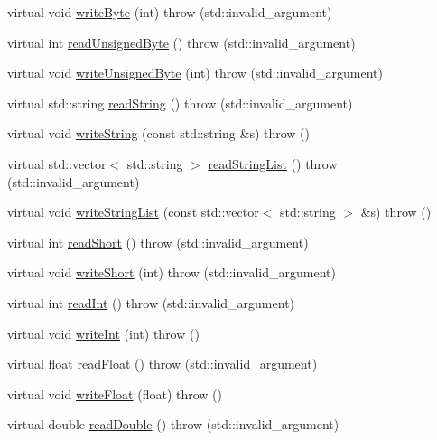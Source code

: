 \begin{DoxyCompactItemize}
virtual void \hyperlink{classtcpip_1_1_storage_a5da17974ce811aefed71169685739073}{write\+Byte} (int)  throw (std\+::invalid\+\_\+argument)
\item 
virtual int \hyperlink{classtcpip_1_1_storage_a46215cfa07dcabbdea932e4c69504019}{read\+Unsigned\+Byte} ()  throw (std\+::invalid\+\_\+argument)
\item 
virtual void \hyperlink{classtcpip_1_1_storage_a5a42840a57331704c2fdc30e3d1d2a54}{write\+Unsigned\+Byte} (int)  throw (std\+::invalid\+\_\+argument)
\item 
virtual std\+::string \hyperlink{classtcpip_1_1_storage_afe367b1d224d73ab06d0ab7899bcd097}{read\+String} ()  throw (std\+::invalid\+\_\+argument)
\item 
virtual void \hyperlink{classtcpip_1_1_storage_a07b6d4f8db8f1893aa4ed419be5a5d25}{write\+String} (const std\+::string \&s)  throw ()
\item 
virtual std\+::vector$<$ std\+::string $>$ \hyperlink{classtcpip_1_1_storage_afc0459cbb0bf405c5d3d1730c5a98b35}{read\+String\+List} ()  throw (std\+::invalid\+\_\+argument)
\item 
virtual void \hyperlink{classtcpip_1_1_storage_ac1d5d12f930b3884f3265508f2b43901}{write\+String\+List} (const std\+::vector$<$ std\+::string $>$ \&s)  throw ()
\item 
virtual int \hyperlink{classtcpip_1_1_storage_a73b9af4fa50e74cb02390240f30fa0c9}{read\+Short} ()  throw (std\+::invalid\+\_\+argument)
\item 
virtual void \hyperlink{classtcpip_1_1_storage_ae7af58d12716f7119877efb7919813f4}{write\+Short} (int)  throw (std\+::invalid\+\_\+argument)
\item 
virtual int \hyperlink{classtcpip_1_1_storage_a04d2fd214a905ad99e9cda8ee7b813e4}{read\+Int} ()  throw (std\+::invalid\+\_\+argument)
\item 
virtual void \hyperlink{classtcpip_1_1_storage_a1babffd3cee462277796bc5b4ef6bb1a}{write\+Int} (int)  throw ()
\item 
virtual float \hyperlink{classtcpip_1_1_storage_aadec452f61b7c9a8996f3b5af6f5b0ce}{read\+Float} ()  throw (std\+::invalid\+\_\+argument)
\item 
virtual void \hyperlink{classtcpip_1_1_storage_ab4fc84f48f0c54fa75bedd69d7293c4c}{write\+Float} (float)  throw ()
\item 
virtual double \hyperlink{classtcpip_1_1_storage_a95d74d22486febfd54070910957f15e2}{read\+Double} ()  throw (std\+::invalid\+\_\+argument)
\item 

\end{DoxyCompactItemize}
